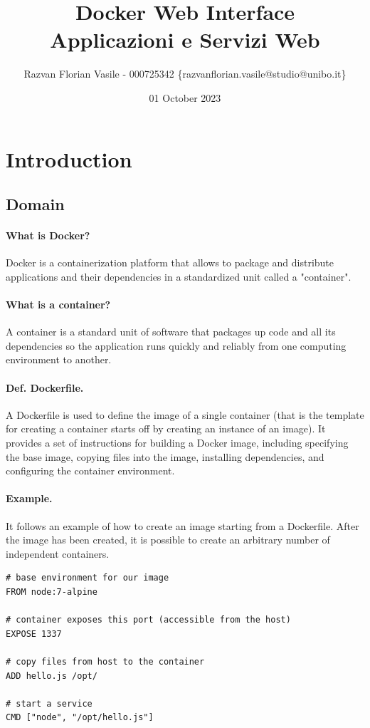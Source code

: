 \documentclass[multi, tikz, a4paper, oneside]{article}
\title{
    Docker Web Interface \\
    \large Applicazioni e Servizi Web
}
\author{Razvan Florian Vasile - 000725342
  \{razvanflorian.vasile@studio@unibo.it\}} \date{01 October 2023}
\begin{document}
\maketitle
\newpage
\tableofcontents
\newpage
\listoffigures
\newpage
\listoftables
\newpage
\section{Introduction}
\subsection{Domain}
\paragraph{What is Docker?}
Docker is a containerization platform that allows to package and distribute
applications and their dependencies in a standardized unit called a "container".

\paragraph{What is a container?}
A container is a standard unit of software that packages up code and all its
dependencies so the application runs quickly and reliably from one computing
environment to another.

\paragraph{Def. Dockerfile.}
A Dockerfile is used to define the image of a single container (that is the
template for creating a container starts off by creating an instance of an
image). It provides a set of instructions for building a Docker image, including
specifying the base image, copying files into the image, installing
dependencies, and configuring the container environment.

\paragraph{Example.} It follows an example of how to create an image starting from a Dockerfile. After
the image has been created, it is possible to create an arbitrary number of
independent containers.
\begin{lstlisting}[language=Docker,caption={Sample Dockerfile},breaklines=true,label={code:compose}]
# base environment for our image
FROM node:7-alpine

# container exposes this port (accessible from the host)
EXPOSE 1337

# copy files from host to the container
ADD hello.js /opt/

# start a service
CMD ["node", "/opt/hello.js"]
\end{lstlisting}
\end{document}
